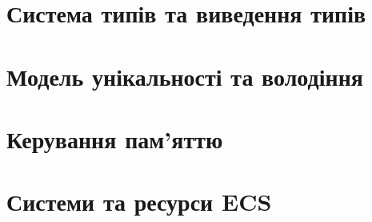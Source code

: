 \section{Система типів та виведення типів}
\label{sec:types}

\section{Модель унікальності та володіння}
\label{sec:ownership}

\section{Керування пам'яттю}
\label{sec:memory}

\section{Системи та ресурси ECS}
\label{sec:ecs}
